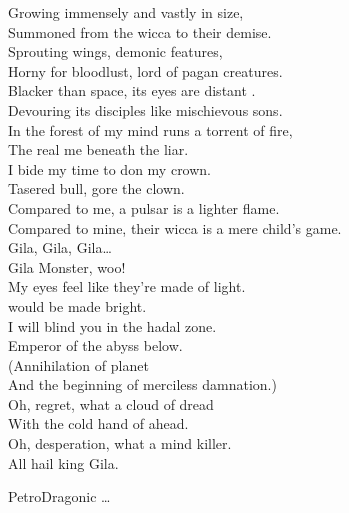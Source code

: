 
Growing immensely and vastly in size, \\
Summoned from the wicca to their demise. \\
Sprouting wings, demonic features, \\
Horny for bloodlust, lord of pagan creatures. \\
Blacker than space, its eyes are distant . \\
Devouring its disciples like mischievous sons. \\

In the forest of my mind runs a torrent of fire, \\
The real me beneath the liar. \\
I bide my time to don my crown. \\
Tasered bull, gore the clown. \\
Compared to me, a pulsar is a lighter flame. \\
Compared to mine, their wicca is a mere child's game. \\

Gila, Gila, Gila… \\
Gila Monster, woo! \\

My eyes feel like they're made of light. \\
 would be made bright. \\
I will blind you in the hadal zone. \\
Emperor of the abyss below. \\

(Annihilation of planet  \\
And the beginning of merciless damnation.) \\

Oh, regret, what a cloud of dread \\
With the cold hand of  ahead. \\
Oh, desperation, what a mind killer. \\
All hail king Gila. \\




PetroDragonic … \\

